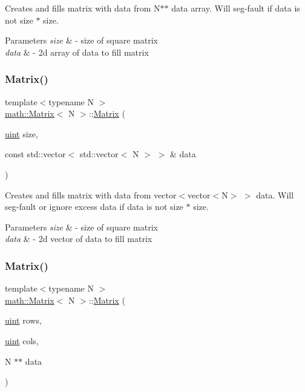 Creates and fills matrix with data from {\ttfamily N$\ast$$\ast$ data} array. Will seg-\/fault if {\ttfamily data} is not {\ttfamily size $\ast$ size}. 
\begin{DoxyParams}{Parameters}
{\em size} & -\/ size of square matrix \\
\hline
{\em data} & -\/ 2d array of data to fill matrix \\
\hline
\end{DoxyParams}
\mbox{\label{classmath_1_1Matrix_a03acfd4595068a1dbfba6ab14dad2be7}} 
\subsubsection{\texorpdfstring{Matrix()}{Matrix()}\hspace{0.1cm}{\footnotesize\ttfamily [4/7]}}
{\footnotesize\ttfamily template$<$typename N $>$ \\
\hyperlink{classmath_1_1Matrix}{math\+::\+Matrix}$<$ N $>$\+::\hyperlink{classmath_1_1Matrix}{Matrix} (\begin{DoxyParamCaption}\item[{\hyperlink{typedefs_8h_a7b9b9413622e67b9df7f2d090b48682b}{uint}}]{size,  }\item[{const std\+::vector$<$ std\+::vector$<$ N $>$ $>$ \&}]{data }\end{DoxyParamCaption})}

Creates and fills matrix with data from {\ttfamily vector$<$vector$<$N$>$ $>$ data}. Will seg-\/fault or ignore excess data if {\ttfamily data} is not {\ttfamily size $\ast$ size}. 
\begin{DoxyParams}{Parameters}
{\em size} & -\/ size of square matrix \\
\hline
{\em data} & -\/ 2d vector of data to fill matrix \\
\hline
\end{DoxyParams}
\mbox{\label{classmath_1_1Matrix_aad0dcb59979136dc4d864bcc782f1d15}} 
\subsubsection{\texorpdfstring{Matrix()}{Matrix()}\hspace{0.1cm}{\footnotesize\ttfamily [5/7]}}
{\footnotesize\ttfamily template$<$typename N $>$ \\
\hyperlink{classmath_1_1Matrix}{math\+::\+Matrix}$<$ N $>$\+::\hyperlink{classmath_1_1Matrix}{Matrix} (\begin{DoxyParamCaption}\item[{\hyperlink{typedefs_8h_a7b9b9413622e67b9df7f2d090b48682b}{uint}}]{rows,  }\item[{\hyperlink{typedefs_8h_a7b9b9413622e67b9df7f2d090b48682b}{uint}}]{cols,  }\item[{N $\ast$$\ast$}]{data }\end{DoxyParamCaption})}

